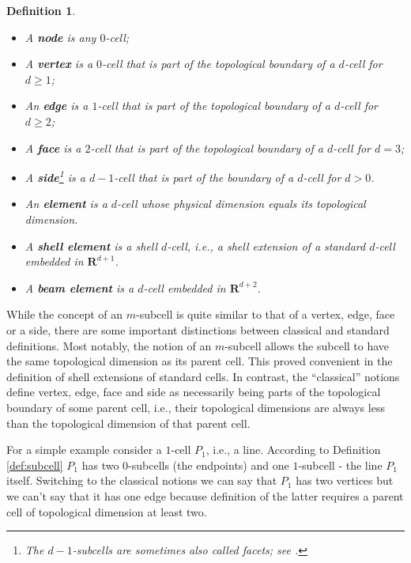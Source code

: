 \documentclass[pdf,12pt,relaxed]{SANDreport}
\newtheorem{defin}{Definition}
\begin{document}
\begin{defin}\label{def:classic}
$\ $
\begin{itemize}
\item A  \textbf{node} is any $0$-cell;
\item A \textbf{vertex} is a $0$-cell that is part of the topological boundary of a $d$-cell for $d\ge 1$;
\item An \textbf{edge} is a $1$-cell that is part of the topological boundary of a $d$-cell for $d\ge 2$;
\item A \textbf{face} is a  $2$-cell that is part of the topological boundary of a $d$-cell for $d = 3$;
\item A \textbf{side}\footnote{The $d-1$-subcells are sometimes also called facets; see \cite{math:polytope}.} is a $d-1$-cell that is part of the boundary of a $d$-cell for $d > 0$.
\item An \textbf{element} is a $d$-cell whose physical dimension equals its topological dimension.
\item A \textbf{shell element} is a shell $d$-cell, i.e., a shell extension of a standard $d$-cell embedded in $\mathbf{R}^{d+1}$.
\item A \textbf{beam element} is a $d$-cell embedded in $\mathbf{R}^{d+2}$.
\end{itemize}
\end{defin}


While the concept of an $m$-subcell is quite similar to that of a vertex, edge, face or a side, there are some important distinctions between classical and standard definitions. Most notably, the notion of an $m$-subcell allows the subcell to have the same topological dimension as its parent cell. This proved convenient in the definition of shell extensions of standard cells. 
In contrast, the ``classical'' notions define vertex, edge, face and side as necessarily being parts of the topological boundary of some parent cell, i.e., their topological dimensions are always less than the topological dimension of that parent cell.

For a simple example consider a $1$-cell $P_1$, i.e., a line. According to Definition \ref{def:subcell} $P_1$ has two $0$-subcells (the endpoints) and one $1$-subcell - the line $P_1$ itself. Switching to the classical notions we can say 
that $P_1$ has two vertices but we can't say that  it has one edge because definition of the latter requires a parent cell of topological dimension at least two.
\end{document}
